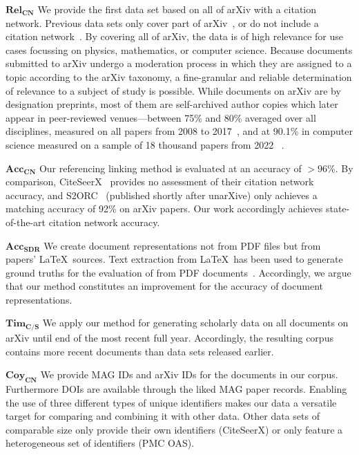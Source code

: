 $\mathbf{Rel_{CN}}$ We provide the first data set based on all of arXiv with a citation network. Previous data sets only cover part of arXiv~\cite{Faerber2018LREC}, or do not include a citation network~\cite{arXMLiv}. By covering all of arXiv, the data is of high relevance for use cases focussing on physics, mathematics, or computer science. %
Because documents submitted to arXiv undergo a moderation process in which they are assigned to a topic according to the arXiv taxonomy, a fine-granular and reliable determination of relevance to a subject of study is possible. While documents on arXiv are by designation preprints, most of them are self-archived author copies which later appear in peer-reviewed venues---between 75\% and 80\% averaged over all disciplines, measured on all papers from 2008 to 2017~\cite{Lin2020}, and at 90.1\% in computer science measured on a sample of 18 thousand papers from 2022~\cite{Bagchi2024} .

$\mathbf{Acc_{CN}}$ Our referencing linking method is evaluated at an accuracy of $>96$\%. By comparison, CiteSeerX~\cite{Wu2015,Wu2016,Patel2021} provides no assessment of their citation network accuracy, and S2ORC~\cite{Lo2020} (published shortly after unarXive) only achieves a matching accuracy of 92\% on arXiv papers. Our work accordingly achieves state-of-the-art citation network accuracy.

$\mathbf{Acc_{SDR}}$ We create document representations not from PDF files but from papers' \LaTeX\ sources. Text extraction from \LaTeX\ has been used to generate ground truths for the evaluation of from PDF documents~\cite{Bast2017}. Accordingly, we argue that our method constitutes an improvement for the accuracy of document representations.

$\mathbf{Tim_{C/S}}$ We apply our method for generating scholarly data on all documents on arXiv until end of the most recent full year. Accordingly, the resulting corpus contains more recent documents than data sets released earlier.

$\mathbf{Coy_{CN}}$ We provide MAG IDs and arXiv IDs for the documents in our corpus. Furthermore DOIs are available through the liked MAG paper records. Enabling the use of three different types of unique identifiers makes our data a versatile target for comparing and combining it with other data. Other data sets of comparable size only provide their own identifiers (CiteSeerX) or only feature a heterogeneous set of identifiers (PMC OAS). \\

